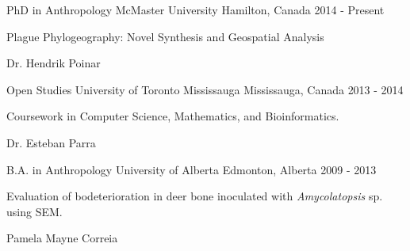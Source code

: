 


\begin{cventries}


\cventry
    {PhD in Anthropology} %
    {McMaster University} %
    {Hamilton, Canada} %
    {2014 - Present} %
    {
        \begin{cvitems} %
            \item {Plague Phylogeography: Novel Synthesis and Geospatial Analysis}
            \item {Dr. Hendrik Poinar}
        \end{cvitems}
    }

\cventry
    {Open Studies} %
    {University of Toronto Mississauga} %
    {Mississauga, Canada} %
    {2013 - 2014} %
    {
        \begin{cvitems} %
            \item {Coursework in Computer Science, Mathematics, and Bioinformatics.}
            \item {Dr. Esteban Parra}
        \end{cvitems}
    }

\cventry
    {B.A. in Anthropology} %
    {University of Alberta} %
    {Edmonton, Alberta} %
    {2009 - 2013} %
    {
        \begin{cvitems} %
            \item {Evaluation of bodeterioration in deer bone inoculated with \textit{Amycolatopsis} sp. using SEM.}
            \item {Pamela Mayne Correia}
        \end{cvitems}
    }

\end{cventries}

